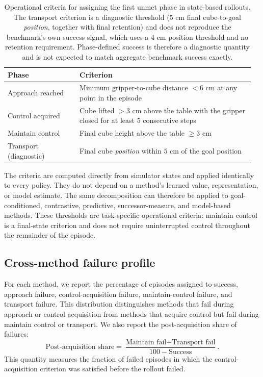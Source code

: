 \begin{table}[htb]
\centering
\caption{Operational criteria for assigning the first unmet phase in state-based rollouts. The transport criterion is a diagnostic threshold ($5$ cm final cube-to-goal \emph{position}, together with final retention) and does not reproduce the benchmark's own success signal, which uses a $4$ cm position threshold and no retention requirement. Phase-defined success is therefore a diagnostic quantity and is not expected to match aggregate benchmark success exactly.}
\label{tab:failure_criteria}
\begin{tabular}{p{0.28\linewidth} p{0.68\linewidth}}
\toprule
\textbf{Phase}      & \textbf{Criterion} \\
\midrule
Approach reached    & Minimum gripper-to-cube distance $<6$ cm at any point in the episode \\ \addlinespace
Control acquired    & Cube lifted $>3$ cm above the table with the gripper closed for at least $5$ consecutive steps \\ \addlinespace
Maintain control    & Final cube height above the table $\geq 3$ cm \\ \addlinespace
Transport (diagnostic) & Final cube \emph{position} within $5$ cm of the goal position \\
\bottomrule
\end{tabular}
\end{table}

The criteria are computed directly from simulator states and applied identically to every policy.
They do not depend on a method's learned value, representation, or model estimate.
The same decomposition can therefore be applied to goal-conditioned, contrastive, predictive, successor-measure, and model-based methods.
These thresholds are task-specific operational criteria: maintain control is a final-state criterion and does not require uninterrupted control throughout the remainder of the episode.

\subsection{Cross-method failure profile}

For each method, we report the percentage of episodes assigned to success, approach failure, control-acquisition failure, maintain-control failure, and transport failure.
This distribution distinguishes methods that fail during approach or control acquisition from methods that acquire control but fail during maintain control or transport.
We also report the post-acquisition share of failures:
\begin{equation}
\text{Post-acquisition share} = \frac{\text{Maintain fail}+\text{Transport fail}} {100-\text{Success}}.
\end{equation}
This quantity measures the fraction of failed episodes in which the control-acquisition criterion was satisfied before the rollout failed.